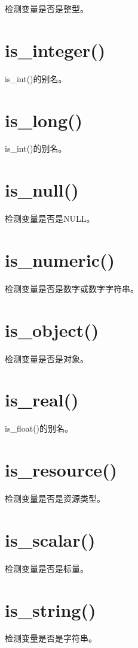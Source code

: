 检测变量是否是整型。

\section{is\_integer()}

is\_int()的别名。

\section{is\_long()}

is\_int()的别名。

\section{is\_null()}

检测变量是否是NULL。

\section{is\_numeric()}

检测变量是否是数字或数字字符串。

\section{is\_object()}

检测变量是否是对象。

\section{is\_real()}

is\_float()的别名。

\section{is\_resource()}

检测变量是否是资源类型。


\section{is\_scalar()}

检测变量是否是标量。

\section{is\_string()}

检测变量是否是字符串。

